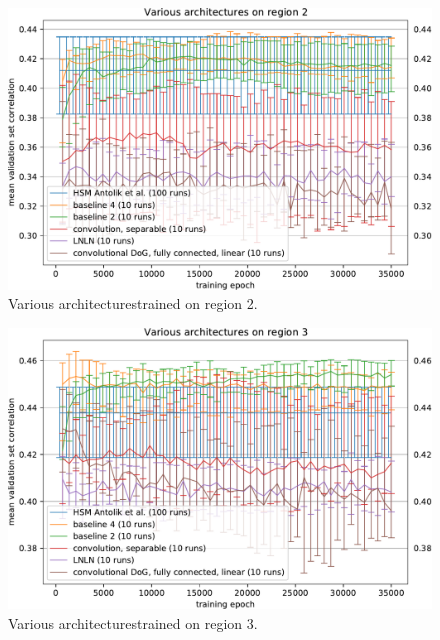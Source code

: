 \begin{figure}[H]
    \centering
    \includegraphics[width=1\textwidth]{../figures/05_3_2_1_2}
    \caption[Various architectures on region 2]{Various architectures\protect\footnotemark trained on {region 2}.}
    \label{fig:5.3.2.1_2}
\end{figure}

\begin{figure}[H]
    \centering
    \includegraphics[width=1\textwidth]{../figures/05_3_2_1_3}
    \caption[Various architectures on region 3]{Various architectures\protect\footnotemark[60] trained on {region 3}.}
    \label{fig:5.3.2.1_3}
\end{figure}


